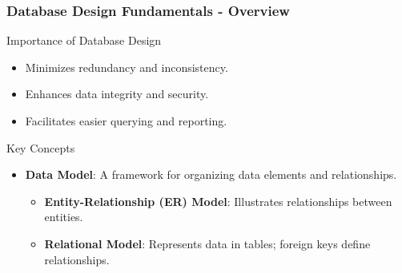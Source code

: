 \documentclass[aspectratio=169]{beamer}
\begin{document}
\begin{frame}[fragile]
    \frametitle{Database Design Fundamentals - Overview}
    \begin{block}{Importance of Database Design}
        \begin{itemize}
            \item Minimizes redundancy and inconsistency.
            \item Enhances data integrity and security.
            \item Facilitates easier querying and reporting.
        \end{itemize}
    \end{block}
    
    \begin{block}{Key Concepts}
        \begin{itemize}
            \item \textbf{Data Model}: A framework for organizing data elements and relationships.
            \begin{itemize}
                \item \textbf{Entity-Relationship (ER) Model}: Illustrates relationships between entities.
                \item \textbf{Relational Model}: Represents data in tables; foreign keys define relationships.
            \end{itemize}
        \end{itemize}
    \end{block}
\end{frame}
\end{document}
